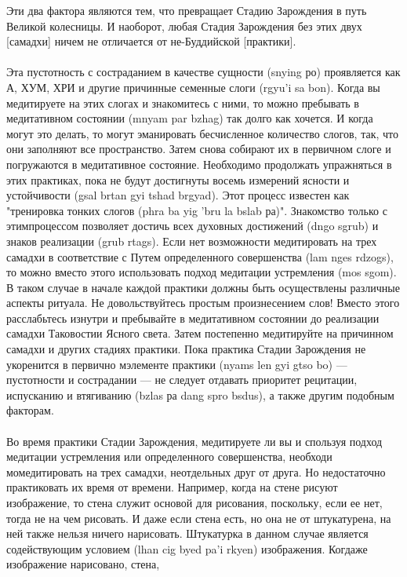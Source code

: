 \begin{siderules}
Эти два фактора являются тем, что превращает Стадию Зарождения в путь Великой
колесницы. И наоборот, любая Стадия Зарождения без этих двух [самадхи] ничем не
отличается от не-Буддийской [практики].\\
\\
Эта пустотность с состраданием в качестве сущности (snying ро) проявляется как А, ХУМ,
ХРИ и другие причинные семенные слоги (rgyu'i sa bon). Когда вы медитируете на этих
слогах и знакомитесь с ними, то можно пребывать в медитативном состоянии (mnyam par
bzhag) так долго как хочется. И когда могут это делать, то могут эманировать бесчисленное
количество слогов, так, что они заполняют все пространство. Затем снова собирают их в
первичном слоге и погружаются в медитативное состояние. Необходимо продолжать
упражняться в этих практиках, пока не будут достигнуты восемь измерений ясности и
устойчивости (gsal brtan gyi tshad brgyad). Этот процесс известен как "тренировка тонких
слогов (phra ba yig 'bru la bslab ра)". Знакомство только с этимпроцессом позволяет достичь
всех духовных достижений (dngo sgrub) и знаков реализации (grub rtags).
Если нет возможности медитировать на трех самадхи в соответствие с Путем определенного
совершенства (lam nges rdzogs), то можно вместо этого использовать подход
медитации устремления (mos sgom). В таком случае в начале каждой практики должны быть
осуществлены различные аспекты ритуала. Не довольствуйтесь простым произнесением
слов! Вместо этого расслабьтесь изнутри и пребывайте в медитативном состоянии до
реализации самадхи Таковостии Ясного света. Затем постепенно медитируйте на причинном
самадхи и других стадиях практики. Пока практика Стадии Зарождения не укоренится в
первично мэлементе практики (nyams len gyi gtso bo) — пустотности и сострадании — не
следует отдавать приоритет рецитации, испусканию и втягиванию (bzlas ра dang spro bsdus),
а также другим подобным факторам.\\
\\
Во время практики Стадии Зарождения, медитируете ли вы и спользуя подход медитации
устремления или определенного совершенства, необходи момедитировать на трех самадхи,
неотдельных друг от друга. Но недостаточно практиковать их время от времени. Например,
когда на стене рисуют изображение, то стена служит основой для рисования, поскольку, если
ее нет, тогда не на чем рисовать. И даже если стена есть, но она не от штукатурена, на ней
также нельзя ничего нарисовать. Штукатурка в данном случае является содействующим
условием (lhan cig byed pa'i rkyen) изображения. Когдаже изображение нарисовано, стена,

\end{siderules}
